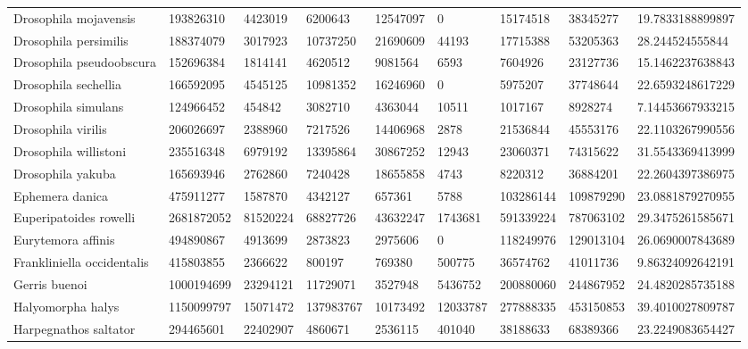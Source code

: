 \begin{table}[]
\begin{tabular}{@{}lllllllll@{}}
Drosophila mojavensis      & 193826310   & 4423019   & 6200643   & 12547097  & 0         & 15174518   & 38345277   & 19.7833188899897  \\
Drosophila persimilis      & 188374079   & 3017923   & 10737250  & 21690609  & 44193     & 17715388   & 53205363   & 28.244524555844   \\
Drosophila pseudoobscura   & 152696384   & 1814141   & 4620512   & 9081564   & 6593      & 7604926    & 23127736   & 15.1462237638843  \\
Drosophila sechellia       & 166592095   & 4545125   & 10981352  & 16246960  & 0         & 5975207    & 37748644   & 22.6593248617229  \\
Drosophila simulans        & 124966452   & 454842    & 3082710   & 4363044   & 10511     & 1017167    & 8928274    & 7.14453667933215  \\
Drosophila virilis         & 206026697   & 2388960   & 7217526   & 14406968  & 2878      & 21536844   & 45553176   & 22.1103267990556  \\
Drosophila willistoni      & 235516348   & 6979192   & 13395864  & 30867252  & 12943     & 23060371   & 74315622   & 31.5543369413999  \\
Drosophila yakuba          & 165693946   & 2762860   & 7240428   & 18655858  & 4743      & 8220312    & 36884201   & 22.2604397386975  \\
Ephemera danica            & 475911277   & 1587870   & 4342127   & 657361    & 5788      & 103286144  & 109879290  & 23.0881879270955  \\
Euperipatoides rowelli     & 2681872052  & 81520224  & 68827726  & 43632247  & 1743681   & 591339224  & 787063102  & 29.3475261585671  \\
Eurytemora affinis         & 494890867   & 4913699   & 2873823   & 2975606   & 0         & 118249976  & 129013104  & 26.0690007843689  \\
Frankliniella occidentalis & 415803855   & 2366622   & 800197    & 769380    & 500775    & 36574762   & 41011736   & 9.86324092642191  \\
Gerris buenoi              & 1000194699  & 23294121  & 11729071  & 3527948   & 5436752   & 200880060  & 244867952  & 24.4820285735188  \\
Halyomorpha halys          & 1150099797  & 15071472  & 137983767 & 10173492  & 12033787  & 277888335  & 453150853  & 39.4010027809787  \\
Harpegnathos saltator      & 294465601   & 22402907  & 4860671   & 2536115   & 401040    & 38188633   & 68389366   & 23.2249083654427  \\

\end{tabular}
\end{table}
